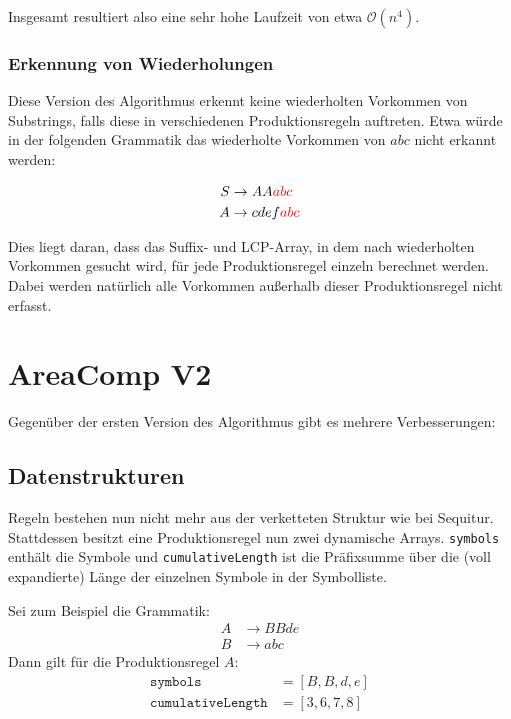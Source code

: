Insgesamt resultiert also eine sehr hohe Laufzeit von etwa $\mathcal{O}(n^4)$.

\subsubsection{Erkennung von Wiederholungen}

Diese Version des Algorithmus erkennt keine wiederholten Vorkommen von Substrings, falls diese in verschiedenen Produktionsregeln auftreten.
Etwa würde in der folgenden Grammatik das wiederholte Vorkommen von $abc$ nicht erkannt werden:

\begin{align*}
	S &\rightarrow AA\textcolor{red}{abc}\\
	A &\rightarrow cdef\textcolor{red}{abc}
\end{align*}

Dies liegt daran, dass das Suffix- und LCP-Array, in dem nach wiederholten Vorkommen gesucht wird, für jede Produktionsregel einzeln berechnet werden. Dabei werden natürlich alle Vorkommen außerhalb dieser Produktionsregel nicht erfasst.

\section{AreaComp V2}


Gegenüber der ersten Version des Algorithmus gibt es mehrere Verbesserungen:

\subsection{Datenstrukturen} Regeln bestehen nun nicht mehr aus der verketteten Struktur wie bei Sequitur. Stattdessen besitzt eine Produktionsregel nun zwei dynamische Arrays. \texttt{symbols} enthält die Symbole und \texttt{cumulativeLength} ist die Präfixsumme über die (voll expandierte) Länge der einzelnen Symbole in der Symbolliste.

Sei zum Beispiel die Grammatik: 
\begin{align*}
	A &\rightarrow BBde\\
	B &\rightarrow abc
\end{align*}
Dann gilt für die Produktionsregel $A$: 
\begin{align*}
	\texttt{symbols} &= [B, B, d, e]\\
	\texttt{cumulativeLength} &= [3, 6, 7, 8]
\end{align*}

